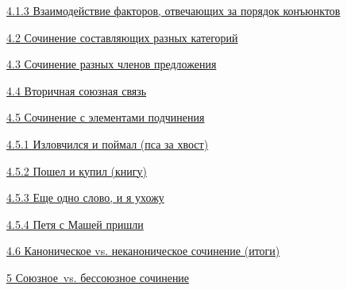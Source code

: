 \protect\hyperlink{ux432ux437ux430ux438ux43cux43eux434ux435ux439ux441ux442ux432ux438ux435-ux444ux430ux43aux442ux43eux440ux43eux432-ux43eux442ux432ux435ux447ux430ux44eux449ux438ux445-ux437ux430-ux43fux43eux440ux44fux434ux43eux43a-ux43aux43eux43dux44aux44eux43dux43aux442ux43eux432}{4.1.3
Взаимодействие факторов, отвечающих за порядок конъюнктов}

\protect\hyperlink{ux441ux43eux447ux438ux43dux435ux43dux438ux435-ux441ux43eux441ux442ux430ux432ux43bux44fux44eux449ux438ux445-ux440ux430ux437ux43dux44bux445-ux43aux430ux442ux435ux433ux43eux440ux438ux439}{4.2
Сочинение составляющих разных категорий}

\protect\hyperlink{ux441ux43eux447ux438ux43dux435ux43dux438ux435-ux440ux430ux437ux43dux44bux445-ux447ux43bux435ux43dux43eux432-ux43fux440ux435ux434ux43bux43eux436ux435ux43dux438ux44f}{4.3
Сочинение разных членов предложения}

\protect\hyperlink{ux432ux442ux43eux440ux438ux447ux43dux430ux44f-ux441ux43eux44eux437ux43dux430ux44f-ux441ux432ux44fux437ux44c}{4.4
Вторичная союзная связь}

\protect\hyperlink{ux441ux43eux447ux438ux43dux435ux43dux438ux435-ux441-ux44dux43bux435ux43cux435ux43dux442ux430ux43cux438-ux43fux43eux434ux447ux438ux43dux435ux43dux438ux44f}{4.5
Сочинение с элементами подчинения}

\protect\hyperlink{ux438ux437ux43bux43eux432ux447ux438ux43bux441ux44f-ux438-ux43fux43eux439ux43cux430ux43b-ux43fux441ux430-ux437ux430-ux445ux432ux43eux441ux442}{4.5.1
Изловчился и поймал (пса за хвост)}

\protect\hyperlink{ux43fux43eux448ux435ux43b-ux438-ux43aux443ux43fux438ux43b-ux43aux43dux438ux433ux443}{4.5.2
Пошел и купил (книгу)}

\protect\hyperlink{ux435ux449ux435-ux43eux434ux43dux43e-ux441ux43bux43eux432ux43e-ux438-ux44f-ux443ux445ux43eux436ux443}{4.5.3
Еще одно слово, и я ухожу}

\protect\hyperlink{ux43fux435ux442ux44f-ux441-ux43cux430ux448ux435ux439-ux43fux440ux438ux448ux43bux438}{4.5.4
Петя с Машей пришли}

\protect\hyperlink{ux43aux430ux43dux43eux43dux438ux447ux435ux441ux43aux43eux435-vs.-ux43dux435ux43aux430ux43dux43eux43dux438ux447ux435ux441ux43aux43eux435-ux441ux43eux447ux438ux43dux435ux43dux438ux435-ux438ux442ux43eux433ux438}{4.6
Каноническое vs. неканоническое сочинение (итоги)}

\protect\hyperlink{ux441ux43eux44eux437ux43dux43eux435-vs.-ux431ux435ux441ux441ux43eux44eux437ux43dux43eux435-ux441ux43eux447ux438ux43dux435ux43dux438ux435}{5
Союзное~vs. бессоюзное сочинение}

